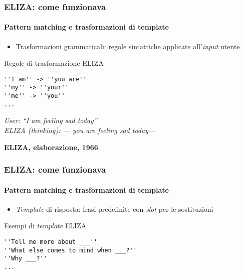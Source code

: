 %
\begin{frame}[t,fragile] \frametitle{ELIZA: come funzionava}
	{\small
		\framesubtitle{Pattern matching e trasformazioni di template}
		\begin{itemize}[leftmargin=10pt,align=right]
			\item[\alert{\faHandORight}] \alert{Trasformazioni grammaticali:} regole sintattiche applicate all'\textit{input} utente
		\end{itemize}
		\vspace*{.3cm}
		\hspace*{4cm}
		\begin{shellcodeblock}{Regole di trasformazione ELIZA}
        	\begin{verbatim}
''I am'' -> ''you are''
''my'' -> ''your''
''me'' -> ''you''
...
        	\end{verbatim}
    	\end{shellcodeblock}
		\hspace*{4cm}
		\begin{minipage}[t]{.6\textwidth}
			\renewcommand{\epigraphsize}{\scriptsize}
			\setlength{\afterepigraphskip}{0pt}
			\setlength{\beforeepigraphskip}{5pt}
			\setlength{\epigraphwidth}{0.9\textwidth}
			\epigraph{\textit{\alert{User:} ``\alert{I am} feeling sad today''\\
			\alert{ELIZA (thinking):} --- \alert{you are} feeling sad today---}}{\textbf{ELIZA, elaborazione, 1966}}
		\end{minipage}
	}
\end{frame}
%
\begin{frame}[t,fragile] \frametitle{ELIZA: come funzionava}
	{\small
		\framesubtitle{Pattern matching e trasformazioni di template}
		\begin{itemize}[leftmargin=10pt,align=right]
			\item[\alert{\faHandORight}] \alert{\textit{Template} di risposta:} frasi predefinite con \textit{slot} per le sostituzioni
		\end{itemize}
		\vspace*{.3cm}
		\hspace*{4cm}
		\begin{shellcodeblock}{Esempi di \textit{template} ELIZA}
        	\begin{verbatim}
''Tell me more about ___''
''What else comes to mind when ___?''
''Why ___?''
...
        	\end{verbatim}
    	\end{shellcodeblock}
	}
\end{frame}
